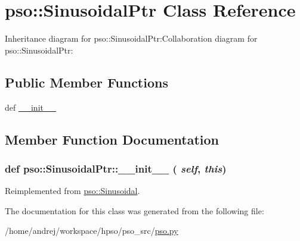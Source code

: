 \hypertarget{classpso_1_1SinusoidalPtr}{
\section{pso::SinusoidalPtr Class Reference}
\label{classpso_1_1SinusoidalPtr}
}
Inheritance diagram for pso::SinusoidalPtr:Collaboration diagram for pso::SinusoidalPtr:\subsection*{Public Member Functions}
\begin{CompactItemize}
\item 
def \hyperlink{classpso_1_1SinusoidalPtr_086a4ea046d5a57f475e3e37952d976a}{\_\-\_\-init\_\-\_\-}
\end{CompactItemize}


\subsection{Member Function Documentation}
\hypertarget{classpso_1_1SinusoidalPtr_086a4ea046d5a57f475e3e37952d976a}{
\subsubsection{\setlength{\rightskip}{0pt plus 5cm}def pso::SinusoidalPtr::\_\-\_\-init\_\-\_\- ( {\em self}, \/   {\em this})}}
\label{classpso_1_1SinusoidalPtr_086a4ea046d5a57f475e3e37952d976a}




Reimplemented from \hyperlink{classpso_1_1Sinusoidal_a75df3138290d6798a97d2ffe7b1c68b}{pso::Sinusoidal}.

The documentation for this class was generated from the following file:\begin{CompactItemize}
\item 
/home/andrej/workspace/hpso/pso\_\-src/\hyperlink{pso_8py}{pso.py}\end{CompactItemize}

